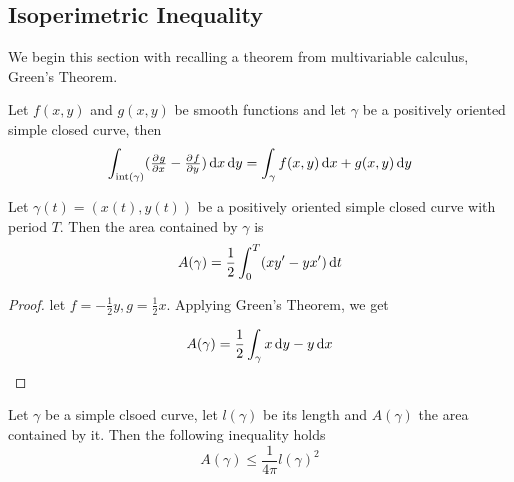
\subsection{Isoperimetric Inequality}
We begin this section with recalling a theorem from multivariable calculus, Green's Theorem.

\begin{theorem}
  Let \(f(x,y)\) and \(g(x,y)\) be smooth functions and let \(\gamma\) be a positively oriented simple closed curve, then
  \[
\int_{\text{int}(\gamma)} (\pd{g}{x} - \pd{f}{y})\dif x \dif y = \int_{\gamma} f(x,y)\dif x + g(x,y) \dif y
\]
\end{theorem}

\begin{proposition}
  Let \(\gamma(t) = (x(t),y(t))\) be a positively oriented simple closed curve with period \(T\). Then the area contained by \(\gamma\) is
  \[
A(\gamma) = \frac{1}{2} \int^{T}_{0} (xy' -yx')\dif t
\]

  \begin{proof}
    let \(f = -\frac{1}{2}y, g = \frac{1}{2}x\). Applying Green's Theorem, we get

    \[
A(\gamma) = \frac{1}{2} \int_{\gamma} x\dif y - y\dif x
\]
  \end{proof}
\end{proposition}

\begin{theorem}
  Let \(\gamma\) be a simple clsoed curve, let \(l(\gamma)\) be its length and \(A(\gamma)\) the area contained by it. Then the following inequality holds
  \[
A(\gamma) \leq \frac{1}{4\pi} l(\gamma)^{2}
\]
\end{theorem}

